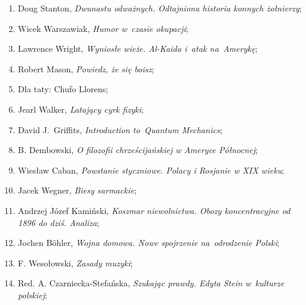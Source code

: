 \documentclass[a4paper,11pt]{article}
\begin{document}
\begin{enumerate}
\item Doug Stanton, \textit{Dwunastu odważnych. Odtajniona historia
    konnych żołnierzy};



\item Wicek Warszawiak, \textit{Humor w~czasie okupacji};



\item Lawrence Wright, \textit{Wyniosłe wieże. Al-Kaida i~atak
    na~Amerykę};



\item Robert Mason, \textit{Powiedz, że się boisz};



\item Dla taty: Chufo Llorens;



\item Jearl Walker, \textit{Latający cyrk fizyki};



\item David J.~Griffits, \textit{Introduction to~Quantum Mechanics};



\item B. Dembowski, \textit{O filozofii chrześcijańskiej w Ameryce
    Północnej};



\item Wiesław Caban, \textit{Powstanie styczniowe. Polacy i Rosjanie w
    XIX wieku};



\item Jacek Wegner, \textit{Biesy sarmackie};



\item Andrzej Józef Kamiński, \textit{Koszmar niewolnictwa. Obozy
    koncentracyjne od 1896 do dziś. Analiza};



\item Jochen B\"{o}hler, \textit{Wojna domowa. Nowe spojrzenie
    na~odrodzenie Polski};



\item F. Wesołowski, \textit{Zasady muzyki};



\item Red. A. Czarniecka-Stefańska, \textit{Szukając prawdy. Edyta Stein
    w~kulturze polskiej};




\end{enumerate}
\end{document}
